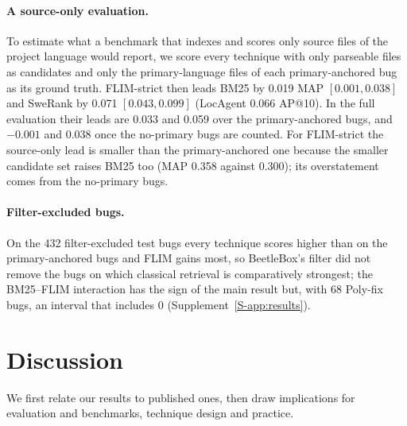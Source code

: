 \documentclass[a4paper,fleqn]{cas-dc}
\begin{document}
\paragraph{A source-only evaluation.} To estimate what a benchmark that
indexes and scores only source files of the project language would report, we
score every technique with only parseable files as candidates and only the
primary-language files of each primary-anchored bug as its ground truth.
FLIM-strict then leads BM25 by 0.019 MAP $[0.001, 0.038]$ and SweRank by
0.071 $[0.043, 0.099]$ (LocAgent 0.066 AP@10). In the full evaluation their
leads are 0.033 and 0.059 over the primary-anchored bugs, and $-0.001$ and
0.038 once the no-primary bugs are counted. For FLIM-strict the source-only
lead is smaller than the primary-anchored one because the smaller candidate
set raises BM25 too (MAP 0.358 against 0.300); its overstatement comes from
the no-primary bugs.

\paragraph{Filter-excluded bugs.} On the 432 filter-excluded test bugs every technique scores higher
than on the primary-anchored bugs and FLIM gains most, so BeetleBox's filter
did not remove the bugs on which classical retrieval is comparatively
strongest; the BM25--FLIM interaction has the sign of the main result but,
with 68 Poly-fix bugs, an interval that includes 0 (Supplement~\ref{S-app:results}).

\section{Discussion}\label{sec:discussion}

We first relate our results to published ones, then draw implications for
evaluation and benchmarks, technique design and practice.
\end{document}

